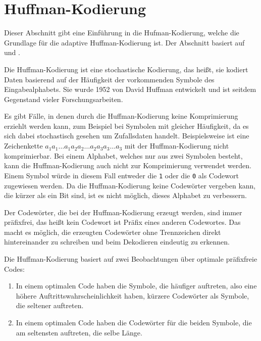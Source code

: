 \documentclass[twoside,11pt,a4paper]{article}
\theoremstyle{break}
\begin{document}


\section{Huffman-Kodierung} \label{sec:huffman}
Dieser Abschnitt gibt eine Einführung in die Hufman-Kodierung, welche
die Grundlage für die adaptive Huffman-Kodierung ist. Der Abschnitt
basiert auf \cite{Salomon:2010} und \cite{Sayood:2006}.

Die Huffman-Kodierung ist eine stochastische Kodierung, das heißt, sie
kodiert Daten basierend auf der Häufigkeit der vorkommenden Symbole
des Eingabealphabets. Sie wurde 1952 von David Huffman entwickelt und
ist seitdem Gegenstand vieler Forschungsarbeiten.

Es gibt Fälle, in denen durch die Huffman-Kodierung keine
Komprimierung erziehlt werden kann, zum Beispiel bei Symbolen mit
gleicher Häufigkeit, da es sich dabei stochastisch gesehen um
Zufallsdaten handelt. Beispielsweise ist eine Zeichenkette
$a_1a_1{\dots}a_1a_2a_2{\dots}a_2a_3a_3{\dots}a_3$ mit der
Huffman-Kodierung nicht komprimierbar. Bei einem Alphabet, welches nur
aus zwei Symbolen besteht, kann die Huffman-Kodierung auch nicht zur
Komprimierung verwendet werden. Einem Symbol würde in diesem Fall
entweder die {\tt1} oder die {\tt0} als Codewort zugewiesen werden.
Da die Huffman-Kodierung keine Codewörter vergeben kann, die kürzer
als ein Bit sind, ist es nicht möglich, dieses Alphabet zu verbessern.

Der Codewörter, die bei der Huffman-Kodierung erzeugt werden, sind
immer präfixfrei, das heißt kein Codewort ist Präfix eines anderen
Codewortes. Das macht es möglich, die erzeugten Codewörter ohne
Trennzeichen direkt hintereinander zu schreiben und beim Dekodieren
eindeutig zu erkennen.

Die Huffman-Kodierung basiert auf zwei Beobachtungen über optimale
präfixfreie Codes:

\begin{enumerate}
\item In einem optimalen Code haben die Symbole, die häufiger
  auftreten, also eine höhere Auftrittswahrscheinlichkeit haben,
  kürzere Codewörter als Symbole, die seltener auftreten.
\item In einem optimalen Code haben die Codewörter für die beiden
  Symbole, die am seltensten auftreten, die selbe Länge.
\end{enumerate}
\end{document}
